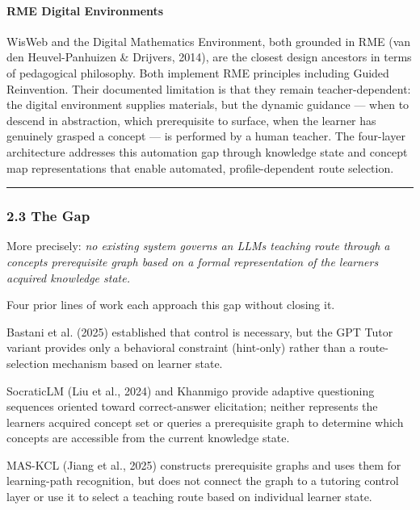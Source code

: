 \documentclass[
]{article}
\begin{document}
\paragraph{RME Digital Environments}\label{rme-digital-environments}

WisWeb and the Digital Mathematics Environment, both grounded in RME (van den Heuvel-Panhuizen \& Drijvers, 2014), are the closest design ancestors in terms of pedagogical philosophy. Both implement RME principles including Guided Reinvention. Their documented limitation is that they remain teacher-dependent: the digital environment supplies materials, but the dynamic guidance --- when to descend in abstraction, which prerequisite to surface, when the learner has genuinely grasped a concept --- is performed by a human teacher. The four-layer architecture addresses this automation gap through knowledge state and concept map representations that enable automated, profile-dependent route selection.

\begin{center}\rule{0.5\linewidth}{0.5pt}\end{center}

\subsubsection{2.3 The Gap}\label{23-the-gap}

More precisely: \emph{no existing system governs an LLM\textquotesingle s teaching route through a concept\textquotesingle s prerequisite graph based on a formal representation of the learner\textquotesingle s acquired knowledge state.}

Four prior lines of work each approach this gap without closing it.

Bastani et al. (2025) established that control is necessary, but the GPT Tutor variant provides only a behavioral constraint (hint-only) rather than a route-selection mechanism based on learner state.

SocraticLM (Liu et al., 2024) and Khanmigo provide adaptive questioning sequences oriented toward correct-answer elicitation; neither represents the learner\textquotesingle s acquired concept set or queries a prerequisite graph to determine which concepts are accessible from the current knowledge state.

MAS-KCL (Jiang et al., 2025) constructs prerequisite graphs and uses them for learning-path recognition, but does not connect the graph to a tutoring control layer or use it to select a teaching route based on individual learner state.
\end{document}
